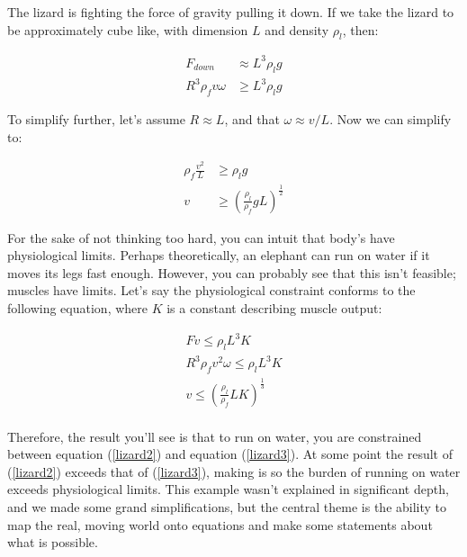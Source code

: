 \documentclass[12pt]{report}
\newcommand{\pr}[1]{\left(#1\right)}
\begin{document}
The lizard is fighting the force of gravity pulling it down. If we take the lizard to be approximately cube like, with dimension $L$ and density $\rho_l$, then: 

\begin{equation} \label{lizard2}
\begin{split}
F_{down} &\approx L^3\rho_l g \\
R^3\rho_f v\omega &\geq L^3\rho_l g
\end{split}
\end{equation}

To simplify further, let's assume $R \approx L$, and that $\omega \approx v / L$. Now we can simplify to: 

\begin{equation} \label{lizard2}
\begin{split}
\rho_f \frac{v^2}{L} &\geq \rho_l g \\
v &\geq \pr{\frac{\rho_l}{\rho_f} gL}^{\frac{1}{2}}
\end{split}
\end{equation}

For the sake of not thinking too hard, you can intuit that body's have physiological limits. Perhaps theoretically, an elephant can run on water if it moves its legs fast enough. However, you can probably see that this isn't feasible; muscles have limits. Let's say the physiological constraint conforms to the following equation, where $K$ is a constant describing muscle output: 

\begin{equation} \label{lizard3}
\begin{split}
F v \leq \rho_l L^3 K \\
R^3\rho_f v^2\omega \leq \rho_l L^3 K \\
v \leq \pr{\frac{\rho_l}{\rho_f} L K}^{\frac{1}{3}} \\
\end{split}
\end{equation}

Therefore, the result you'll see is that to run on water, you are constrained between equation (\ref{lizard2}) and equation (\ref{lizard3}). At some point the result of (\ref{lizard2}) exceeds that of (\ref{lizard3}), making is so the burden of running on water exceeds physiological limits. This example wasn't explained in significant depth, and we made some grand simplifications, but the central theme is the ability to map the real, moving world onto equations and make some statements about what is possible. 
\end{document}
